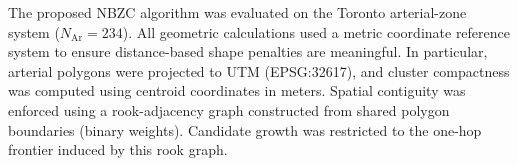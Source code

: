 \documentclass[conference]{IEEEtran}
\begin{document}
The proposed NBZC algorithm was evaluated on the Toronto arterial-zone system
($N_{\mathrm{Ar}}=234$). All geometric calculations used a metric coordinate
reference system to ensure distance-based shape penalties are meaningful. In
particular, arterial polygons were projected to UTM (EPSG:32617), and cluster
compactness was computed using centroid coordinates in meters.
Spatial contiguity was enforced using a rook-adjacency graph constructed from
shared polygon boundaries (binary weights). Candidate growth was restricted to
the one-hop frontier induced by this rook graph. 

\end{document}
